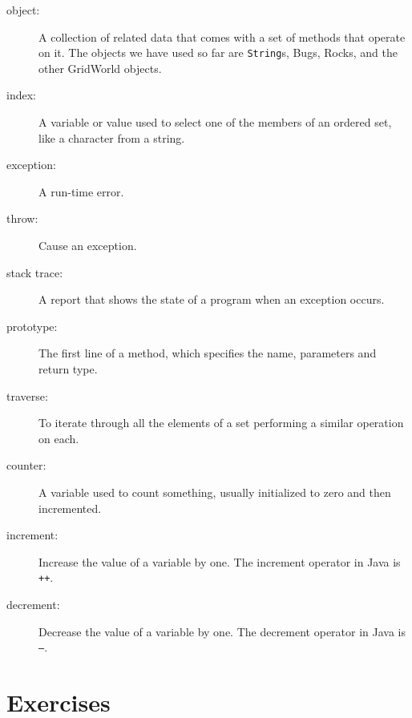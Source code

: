 \documentclass[12pt]{book}
\theoremstyle{definition}
\begin{document}
\begin{description}

\item[object:] A collection of related data that comes with a set of
methods that operate on it.  The objects we have used so far are
{\tt String}s, Bugs, Rocks, and the other GridWorld objects.

\item[index:]  A variable or value used to select one of the
members of an ordered set, like a character from a string.

\item[exception:] A run-time error.

\item[throw:] Cause an exception.

\item[stack trace:] A report that shows the state of a program
when an exception occurs.

\item[prototype:]  The first line of a method, which specifies
the name, parameters and return type.

\item[traverse:]  To iterate through all the elements of a set
performing a similar operation on each.

\item[counter:]  A variable used to count something, usually
initialized to zero and then incremented.

\item[increment:]  Increase the value of a variable by one.
The increment operator in Java is {\tt ++}.

\item[decrement:]  Decrease the value of a variable by one.
The decrement operator in Java is {\tt --}.



\end{description}


\section{Exercises}
\end{document}
